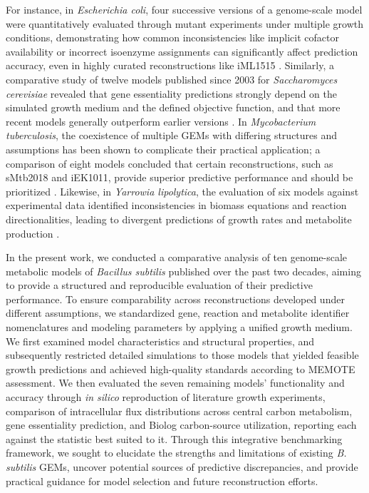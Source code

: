 \documentclass[11pt, a4paper]{article}
\begin{document}
\medskip

For instance, in \textit{Escherichia coli}, four successive versions of a genome-scale model were quantitatively evaluated through mutant experiments under multiple growth conditions, demonstrating how common inconsistencies like implicit cofactor availability or incorrect isoenzyme assignments can significantly affect prediction accuracy, even in highly curated reconstructions like iML1515 \parencite{bernstein-2023}. Similarly, a comparative study of twelve models published since 2003 for \textit{Saccharomyces cerevisiae} revealed that gene essentiality predictions strongly depend on the simulated growth medium and the defined objective function, and that more recent models generally outperform earlier versions \parencite{heavner-2015}. In \textit{Mycobacterium tuberculosis}, the coexistence of multiple GEMs with differing structures and assumptions has been shown to complicate their practical application; a comparison of eight models concluded that certain reconstructions, such as sMtb2018 and iEK1011, provide superior predictive performance and should be prioritized \parencite{lopez-agudelo-2020}. Likewise, in \textit{Yarrowia lipolytica}, the evaluation of six models against experimental data identified inconsistencies in biomass equations and reaction directionalities, leading to divergent predictions of growth rates and metabolite production \parencite{xu-2020}.

\medskip

In the present work, we conducted a comparative analysis of ten genome-scale metabolic models of \textit{Bacillus subtilis} published over the past two decades, aiming to provide a structured and reproducible evaluation of their predictive performance. To ensure comparability across reconstructions developed under different assumptions, we standardized gene, reaction and metabolite identifier nomenclatures and modeling parameters by applying a unified growth medium. We first examined model characteristics and structural properties, and subsequently restricted detailed simulations to those models that yielded feasible growth predictions and achieved high-quality standards according to MEMOTE assessment. We then evaluated the seven remaining models' functionality and accuracy through \textit{in silico} reproduction of literature growth experiments, comparison of intracellular flux distributions across central carbon metabolism, gene essentiality prediction, and Biolog carbon-source utilization, reporting each against the statistic best suited to it.
 Through this integrative benchmarking framework, we sought to elucidate the strengths and limitations of existing \textit{B. subtilis} GEMs, uncover potential sources of predictive discrepancies, and provide practical guidance for model selection and future reconstruction efforts. 
\end{document}
